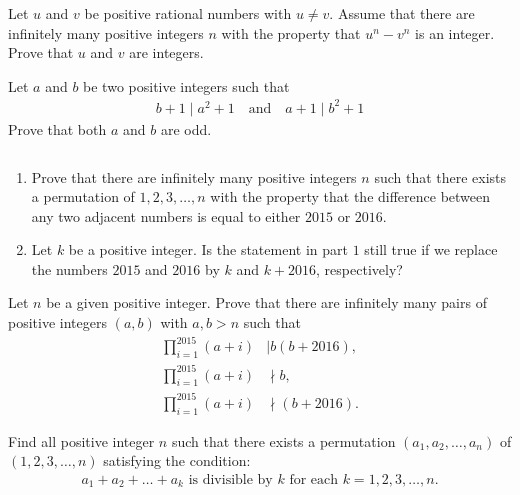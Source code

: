 \documentclass[problems.tex]{subfile}
\begin{document}
	
	\begin{problem}
		Let $u$ and $v$ be positive rational numbers with $u \neq v$. Assume that there are infinitely many positive integers $n$ with the property that $u^n - v^n$ is an integer. Prove that $u$ and $v$ are integers.
	\end{problem}
	
	
	\begin{problem}
		Let $a$ and $b$ be two positive integers such that
		\begin{align*}
			b + 1 \mid a^2 + 1 \quad \text{and} \quad a + 1 \mid b^2 + 1
		\end{align*}
		Prove that both $a$ and $b$ are odd.
	\end{problem}
	
	
	\begin{problem}
		$ $
		\begin{enumerate}
			\item Prove that there are infinitely many positive integers $n$ such that there exists a permutation of $1, 2,3, \dots, n$ with the property that the difference between any two adjacent numbers is equal to either $2015$ or $2016$.
			\item Let $k$ be a positive integer. Is the statement in part $1$ still true if we replace the numbers $2015$ and $2016$ by $k$ and $k + 2016$, respectively?
		\end{enumerate}
	\end{problem}
	
	
	\begin{problem}
		Let $n$ be a given positive integer. Prove that there are infinitely many pairs of positive integers $(a, b)$ with $a, b > n$ such that
		\begin{align*}
			\prod_{i=1}^{2015} (a+i) &\mid b(b+2016),\\
			\prod_{i=1}^{2015} (a+i) &\nmid b,\\
			\prod_{i=1}^{2015} (a+i) &\nmid (b+2016).
		\end{align*}
	\end{problem}
	
	
	
	\begin{problem}
		Find all positive integer $n$ such that there exists a permutation $(a_1, a_2,\dots , a_n)$ of $(1, 2,3, \dots, n)$ satisfying the condition:
		\begin{align*}
			a_1 + a_2 + \dots+ a_k \text{ is divisible by } k \text{ for each } k = 1,2, 3,\dots, n.
		\end{align*}
	\end{problem}
	
\end{document}
